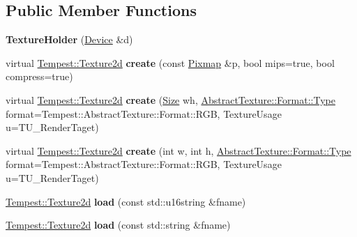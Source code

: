 \subsection*{Public Member Functions}
\begin{DoxyCompactItemize}
\item 
\hypertarget{class_tempest_1_1_texture_holder_af20db0a14c5e38acfcfee655a1738d3e}{{\bfseries Texture\+Holder} (\hyperlink{class_tempest_1_1_device}{Device} \&d)}\label{class_tempest_1_1_texture_holder_af20db0a14c5e38acfcfee655a1738d3e}

\item 
\hypertarget{class_tempest_1_1_texture_holder_a0da5aaa94c4068cb5d0e13589b6322c3}{virtual \hyperlink{class_tempest_1_1_texture2d}{Tempest\+::\+Texture2d} {\bfseries create} (const \hyperlink{class_tempest_1_1_pixmap}{Pixmap} \&p, bool mips=true, bool compress=true)}\label{class_tempest_1_1_texture_holder_a0da5aaa94c4068cb5d0e13589b6322c3}

\item 
\hypertarget{class_tempest_1_1_texture_holder_aeda63ebf163eef3c8fb09555752dd916}{virtual \hyperlink{class_tempest_1_1_texture2d}{Tempest\+::\+Texture2d} {\bfseries create} (\hyperlink{struct_tempest_1_1_size}{Size} wh, \hyperlink{struct_tempest_1_1_abstract_texture_1_1_format_a231a1f516e53783bf72c713669b115b3}{Abstract\+Texture\+::\+Format\+::\+Type} format=Tempest\+::\+Abstract\+Texture\+::\+Format\+::\+R\+G\+B, Texture\+Usage u=T\+U\+\_\+\+Render\+Taget)}\label{class_tempest_1_1_texture_holder_aeda63ebf163eef3c8fb09555752dd916}

\item 
\hypertarget{class_tempest_1_1_texture_holder_a67f448ee0347b6cd954920d7d5560c4a}{virtual \hyperlink{class_tempest_1_1_texture2d}{Tempest\+::\+Texture2d} {\bfseries create} (int w, int h, \hyperlink{struct_tempest_1_1_abstract_texture_1_1_format_a231a1f516e53783bf72c713669b115b3}{Abstract\+Texture\+::\+Format\+::\+Type} format=Tempest\+::\+Abstract\+Texture\+::\+Format\+::\+R\+G\+B, Texture\+Usage u=T\+U\+\_\+\+Render\+Taget)}\label{class_tempest_1_1_texture_holder_a67f448ee0347b6cd954920d7d5560c4a}

\item 
\hypertarget{class_tempest_1_1_texture_holder_a816f739cb86dfc457c49b1a54ace274c}{\hyperlink{class_tempest_1_1_texture2d}{Tempest\+::\+Texture2d} {\bfseries load} (const std\+::u16string \&fname)}\label{class_tempest_1_1_texture_holder_a816f739cb86dfc457c49b1a54ace274c}

\item 
\hypertarget{class_tempest_1_1_texture_holder_a4e39cc20b92378fd27465cfe4935f03d}{\hyperlink{class_tempest_1_1_texture2d}{Tempest\+::\+Texture2d} {\bfseries load} (const std\+::string \&fname)}\label{class_tempest_1_1_texture_holder_a4e39cc20b92378fd27465cfe4935f03d}


\end{DoxyCompactItemize}
